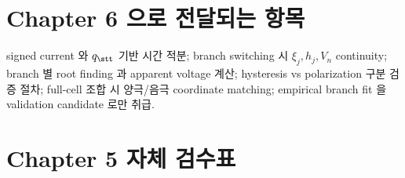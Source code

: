 \section{Chapter 6 으로 전달되는 항목}\label{sec:ch5_transmit}
signed current 와 $q_\stt$ 기반 시간 적분; branch switching 시 $\xi_j,h_j,V_n$ continuity; branch 별 root
finding 과 apparent voltage 계산; hysteresis vs polarization 구분 검증 절차; full-cell 조합 시 양극/음극
coordinate matching; empirical branch fit 을 validation candidate 로만 취급.

\section{Chapter 5 자체 검수표}\label{sec:ch5_selfcheck}
